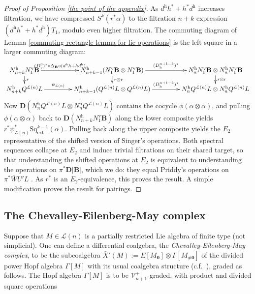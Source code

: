 \documentclass[11pt]{amsart} \renewcommand{\baselinestretch}{1.2}
\theoremstyle{plain}
\numberwithin{equation}{section} %
\theoremstyle{plain}
\numberwithin{equation}{chapter} %
\let\oldphi\phi
\let\phi\varphi
\newcommand{\calL}{\mathcal{L}}
\newcommand{\calV}{\mathcal{V}}
\newcommand{\DeltatubfD}{\Delta_{\mathrm{\textbf{B}}}}
\newcommand{\citeBOX}[2][]{\cite[\mbox{#1}]{#2}}
\newcommand{\vect}[2]{\calV^{#1}_{#2}}
\newcommand{\ExtCohOp}{\mathrm{Sq}_\mathrm{ext}}
\newcommand{\UEA}{U'}%
\newcommand{\UEAX}{\bar{X}'}%
\newcommand{\uver}{^\mathrm{v}}
\newcommand{\uhor}{^\mathrm{h}}
\newcommand{\dver}{_\mathrm{v}}
\newcommand{\dhor}{_\mathrm{h}}
\newcommand{\deltav}{\delta\uver}
\newcommand{\diag}[1]{|#1|}
\newcommand{\dual}{\mathbf{D}}
\newcommand{\SubsectionOrSection}[1]{\subsection{#1}}
\begin{document}
\begin{appendices}
\begin{proof}[Proof of Proposition \ref{the point of the appendix}]
As $d\uhor h^*+ h^*d\uhor$ increases filtration, we have compressed $S^k(r^*\alpha)$ to the filtration $n+k$ expression $(d\uhor h^*+ h^*d\uhor)T_1$, modulo even higher filtration.
The commuting diagram of Lemma \ref{commuting rectangle lemma for lie operations} is the left square in a larger commuting diagram:
\[\xymatrix@R=4mm@C=15mm{
N\uhor_{n+k}N\uver_1\textbf{B} \ar[d]^-{r}
 \ar[r]^-{(D\dver^0)^\star\circ\DeltatubfD\circ (d\uhor h+hd\uhor)}&%
N\uhor_{n+k-1}(N\uver_1\textbf{B}\otimes N\uver_1\textbf{B})\ar[d]^-{r\otimes r}\ar[r]^-{ (D\dhor^{n+1-k})^\star}
&
N\uhor_nN\uver_1\textbf{B}\otimes N\uhor_nN\uver_1\textbf{B}\ar[d]^-{r\otimes r}
\\%
N\uhor_{n+k}Q^{\calL(n)} L  \ar[r]^-{\psi_{\calL(n)}}&%
N\uhor_{n+k-1}(Q^{\calL(n)} L \otimes Q^{\calL(n)} L )
\ar[r]^-{ (D\dhor^{n+1-k})^\star}
&
N\uhor_nQ^{\calL(n)} L \otimes N\uhor_nQ^{\calL(n)} L 
}\]
Now $\dual(N\uhor_nQ^{\calL(n)} L \otimes N\uhor_nQ^{\calL(n)} L )$ contains the cocycle $\oldphi(\alpha\otimes\alpha)$, and pulling $\oldphi(\alpha\otimes\alpha)$ back to $\dual(N\uhor_{n+k}N\uver_1\textbf{B})$ along the lower composite yields $r^*\psi_{\calL(n)}^*\ExtCohOp^{k-1}(\alpha)$. Pulling back along the upper composite yields the $E_2$ representative of the shifted version of Singer's operations. 
Both spectral sequences collapse at $E_2$ and induce trivial filtrations on their shared target, so that understanding the shifted operations at $E_2$ is equivalent to understanding the operations on $\pi^*\dual\diag{\textbf{B}}$, which we do: they equal Priddy's operations on $\pi^*\bar{W}\UEA L$ \cite[\S5]{PriddySimplicialLie.pdf}.
As $r^*$ is an $E_2$-equivalence, this proves the result. A simple modification proves the result for pairings.
\end{proof}
\SubsectionOrSection{The Chevalley-Eilenberg-May complex}
\label{The Chevalley-Eilenberg-May complex}
Suppose that $M\in\calL(n)$ is a partially restricted Lie algebra of finite type (not simplicial). One can define a differential coalgebra, the \emph{Chevalley-Eilenberg-May complex}, to be the subcoalgebra $\UEAX(M):= E[M_{\textbf{0}}]\otimes \Gamma[M_{\neq\textbf{0}}]$ of the divided power Hopf algebra $\Gamma[M]$ with its usual coalgebra structure (c.f.\ \citeBOX[p.~141]{MayRestLie.pdf}), graded as follows. 
The Hopf algebra $\Gamma[M]$ is to be $\vect{+}{n+1}$-graded, with product and divided square operations
\begin{gather*}

\end{gather*}
\end{appendices}
\end{document}
